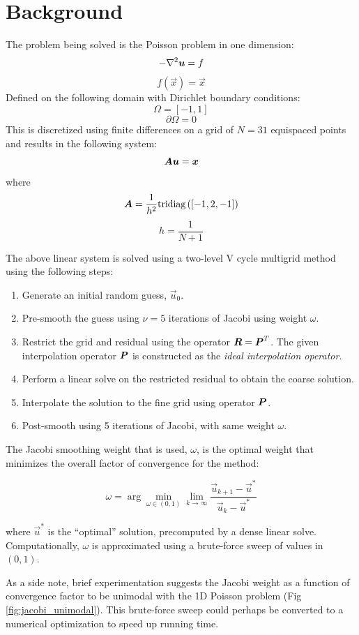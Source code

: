 


\section{Background}
The problem being solved is the Poisson problem in one dimension:
$$ -\nabla^2\bm{{u}} = f $$
$$ f(\vec{x}) = \vec{x} $$
Defined on the following domain with Dirichlet boundary conditions:
$$ \Omega = \left[-1, 1\right]$$
$$ \partial\Omega = 0 $$
This is discretized using finite differences on a grid of $N=31$ equispaced points and results in the following system:
$$ \bm{{A}}\bm{{u}} = \bm{{x}} $$
where
$$\bm{{A}} = \frac{1}{h^2} \text{tridiag}\left(\left[-1, 2, -1\right]\right)$$
$$h = \frac{1}{N+1}$$

The above linear system is solved using a two-level V cycle multigrid method using the following steps:

\begin{enumerate}
\item Generate an initial random guess, $\vec{u}_0$.
\item Pre-smooth the guess using $\nu=5$ iterations of Jacobi using weight $\omega$.
\item Restrict the grid and residual using the operator $\bm{{R}}=\bm{{P}}^T$.  The given interpolation operator $\bm{{P}}$ is constructed as the \textit{ideal interpolation operator}.
\item Perform a linear solve on the restricted residual to obtain the coarse solution.
\item Interpolate the solution to the fine grid using operator $\bm{{P}}$.
\item Post-smooth using 5 iterations of Jacobi, with same weight $\omega$.
\end{enumerate}

The Jacobi smoothing weight that is used, $\omega$, is the optimal weight that minimizes the overall factor of convergence for the method:

$$\omega = \arg \min_{\omega\in\left(0,1\right)} \lim_{k\to\infty} \frac{ \vec{u}_{k+1} - \vec{u}^* }{ \vec{u}_{k} - \vec{u}^* }$$

where $\vec{u}^*$ is the ``optimal'' solution, precomputed by a dense linear solve.  Computationally, $\omega$ is approximated using a brute-force sweep of values in $\left(0, 1\right) $.

As a side note, brief experimentation suggests the Jacobi weight as a function of convergence factor to be unimodal with the 1D Poisson problem (Fig \ref{fig:jacobi_unimodal}).  This brute-force sweep could perhaps be converted to a numerical optimization to speed up running time.

